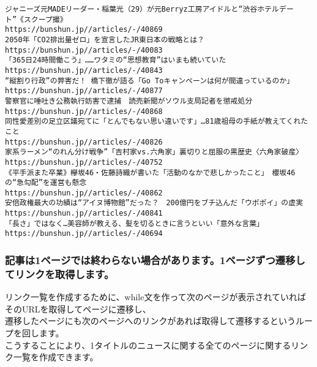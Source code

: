 \documentclass[11pt]{article}
\begin{document}
    \begin{Verbatim}[commandchars=\\\{\}]
ジャニーズ元MADEリーダー・稲葉光（29）が元Berryz工房アイドルと“渋谷ホテルデート”《スクープ撮》
https://bunshun.jp//articles/-/40869
2050年「CO2排出量ゼロ」を宣言したJR東日本の戦略とは？
https://bunshun.jp//articles/-/40083
「365日24時間働こう」……ワタミの“思想教育”はいまも続いていた
https://bunshun.jp//articles/-/40843
“縦割り行政”の弊害だ！ 橋下徹が語る「Go Toキャンペーンは何が間違っているのか」
https://bunshun.jp//articles/-/40877
警察官に唾吐き公務執行妨害で逮捕　読売新聞がソウル支局記者を懲戒処分
https://bunshun.jp//articles/-/40868
同性愛差別の足立区議宛てに「とんでもない思い違いです」…81歳祖母の手紙が教えてくれたこと
https://bunshun.jp//articles/-/40826
家系ラーメン“のれん分け戦争”「吉村家vs.六角家」裏切りと屈服の黒歴史〈六角家破産〉
https://bunshun.jp//articles/-/40752
《平手派また卒業》欅坂46・佐藤詩織が書いた「活動のなかで悲しかったこと」　櫻坂46の“急勾配”を運営も懸念
https://bunshun.jp//articles/-/40862
安倍政権最大の功績は“アイヌ博物館”だった？　200億円をブチ込んだ「ウポポイ」の虚実
https://bunshun.jp//articles/-/40841
「長さ」ではなく…美容師が教える、髪を切るときに言うといい「意外な言葉」
https://bunshun.jp//articles/-/40694
    \end{Verbatim}

    \hypertarget{ux8a18ux4e8bux306f1ux30daux30fcux30b8ux3067ux306fux7d42ux308fux3089ux306aux3044ux5834ux5408ux304cux3042ux308aux307eux30591ux30daux30fcux30b8ux305aux3064ux9077ux79fbux3057ux3066ux30eaux30f3ux30afux3092ux53d6ux5f97ux3057ux307eux3059}{%
\subsubsection{記事は1ページでは終わらない場合があります。1ページずつ遷移してリンクを取得します。}\label{ux8a18ux4e8bux306f1ux30daux30fcux30b8ux3067ux306fux7d42ux308fux3089ux306aux3044ux5834ux5408ux304cux3042ux308aux307eux30591ux30daux30fcux30b8ux305aux3064ux9077ux79fbux3057ux3066ux30eaux30f3ux30afux3092ux53d6ux5f97ux3057ux307eux3059}}

リンク一覧を作成するために、while文を作って次のページが表示されていればそのURLを取得してページに遷移し、\\
遷移したページにも次のページへのリンクがあれば取得して遷移するというループを回します。\\
こうすることにより、1タイトルのニュースに関する全てのページに関するリンク一覧を作成できます。
\end{document}
